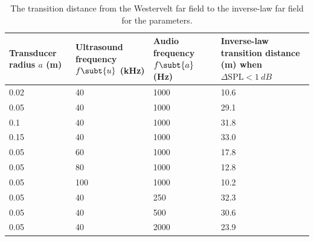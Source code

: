 \begin{table}
    \centering
    \begin{tabular}{p{}p{}p{}p{}}
        \toprule
        Transducer radius $a$ (m) & Ultrasound frequency $f\subt{u}$ (kHz) & Audio frequency $f\subt{a}$ (Hz) & Inverse-law transition distance (m) when $\Delta \mathrm{SPL} < \SI{1}{dB}$ \\
        \midrule
        
0.02                    & 40                            & 1000                    & 10.6                                                           \\
0.05                    & 40                            & 1000                    & 29.1                                                           \\
0.1                     & 40                            & 1000                    & 31.8                                                           \\
0.15                    & 40                            & 1000                    & 33.0                                                           \\
0.05                    & 60                            & 1000                    & 17.8                                                           \\
0.05                    & 80                            & 1000                    & 12.8                                                           \\
0.05                    & 100                           & 1000                    & 10.2                                                           \\
0.05                    & 40                            & 250                     & 32.3                                                           \\
0.05                    & 40                            & 500                     & 30.6                                                           \\
0.05                    & 40                            & 2000                    & 23.9                                                          \\
        \bottomrule
    \end{tabular}
    \caption{The transition distance from the Westervelt far field to the
inverse-law far field for the parameters.}
    \label{tab:maxima:near_field_to_westervelt_field1}
\end{table}

